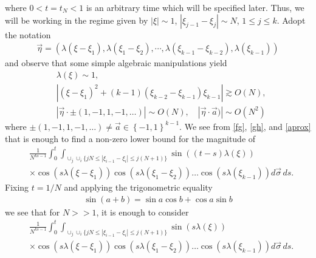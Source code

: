 \documentclass{amsart}
\begin{document}
where $0<t=t_N<1$ is an arbitrary time which will be specified later. 
Thus, we will be working in the regime given by $|\xi| \sim 1$, $|\xi_{j-1} - \xi_{j}|\sim N$, $1 \le j \le k$. Adopt the notation
\begin{equation*}
\begin{split}
  \vec{\eta} = \left( \lambda(\xi - \xi_{1}), \lambda(\xi_{1} - \xi_{2}), \cdots, \lambda(\xi_{k-1} - \xi_{k-2}), \lambda(\xi_{k-1}) \right)
\end{split}
\end{equation*}
and observe that some simple algebraic manipulations yield
\begin{equation}
\begin{split}
& 
\lambda(\xi) \sim 1,
\\
& 
|(\xi - \xi_{1})^{2} + (k-1)(\xi_{k-2} - \xi_{k-1})\xi_{k-1}|
\gtrsim O(N),
\\
&
|\vec{\eta} \cdot \pm (1, -1, 1, -1, \ldots )| \sim O(N), \quad
|\vec{\eta} \cdot  \vec{a} )| \sim O(N^{2})
\label{aprox}
\end{split}
\end{equation}
where $\pm (1, -1, 1, -1, \ldots ) \neq \vec{a} \in \left\{ -1, 1 \right\}^{k-1}$.
We see from \eqref{fg}, \eqref{gh}, and \eqref{aprox} that is enough to find a non-zero lower bound for the magnitude of
\begin{equation}
\begin{split}
& \frac{1}{N^{ks-1}}\int_0^t 
\int_{\cup_{j} \cup_{i}\{jN \leq |\xi_{i-1}-\xi_{i}|\leq j(N+1)\}}
\sin((t-s) \lambda(\xi))
\\
& \times 
\cos(s \lambda(\xi- \xi_{1}))
\cos(s \lambda(\xi_{1}- \xi_{2}))\dots\cos(s\lambda(\xi_{k-1}))
d \vec{\sigma}\,ds.
\end{split}
\end{equation}
Fixing $t = 1/N$ and applying the trigonometric equality
\begin{equation*}
\begin{split}
\sin(a + b) = \sin a \cos b + \cos a \sin b
\end{split}
\end{equation*}
we see that for $N >> 1$, it is enough to consider
\begin{equation}
\begin{split}
& \frac{1}{N^{ks-1}}\int_0^t 
\int_{\cup_{j} \cup_{i}\{jN \leq |\xi_{i-1}-\xi_{i}|\leq j(N+1)\}}
\sin(s \lambda(\xi))
\\
& \times 
\cos(s \lambda(\xi- \xi_{1}))
\cos(s \lambda(\xi_{1}- \xi_{2}))\dots\cos(s\lambda(\xi_{k-1}))
d \vec{\sigma}\,ds.
\end{split}
\end{equation}
\end{document}
